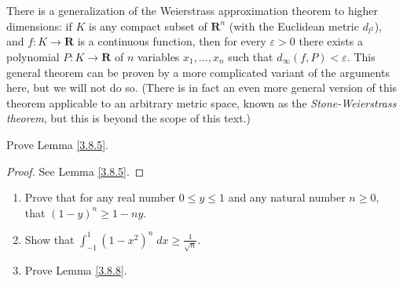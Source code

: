 \begin{remark}\label{3.8.21}
    There is a generalization of the Weierstrass approximation theorem to higher dimensions:
    if \(K\) is any compact subset of \(\mathbf{R}^n\) (with the Euclidean metric \(d_{l^2}\)), and \(f : K \to \mathbf{R}\) is a continuous function, then for every \(\varepsilon > 0\) there exists a polynomial \(P : K \to \mathbf{R}\) of \(n\) variables \(x_1, \dots, x_n\) such that \(d_\infty(f, P) < \varepsilon\).
    This general theorem can be proven by a more complicated variant of the arguments here, but we will not do so.
    (There is in fact an even more general version of this theorem applicable to an arbitrary metric space, known as the \emph{Stone-Weierstrass theorem}, but this is beyond the scope of this text.)
\end{remark}

\exercisesection

\begin{exercise}\label{ex 3.8.1}
    Prove Lemma \ref{3.8.5}.
\end{exercise}

\begin{proof}
    See Lemma \ref{3.8.5}.
\end{proof}

\begin{exercise}\label{ex 3.8.2}
    \quad
    \begin{enumerate}
        \item Prove that for any real number \(0 \leq y \leq 1\) and any natural number \(n \geq 0\), that \((1 - y)^n \geq 1 - ny\).
        \item Show that \(\int_{-1}^1 (1 - x^2)^n \; dx \geq \frac{1}{\sqrt{n}}\).
        \item Prove Lemma \ref{3.8.8}.
    \end{enumerate}
\end{exercise}

